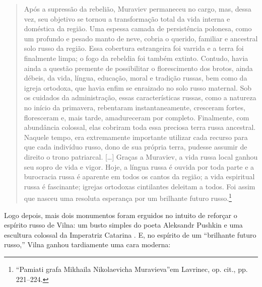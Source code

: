 \begin{quote}
Após a supressão da rebelião, Muraviev permaneceu no cargo, mas, dessa
vez, seu objetivo se tornou a transformação total da vida interna e
doméstica da região. Uma espessa camada de persistência polonesa, como
um profundo e pesado manto de neve, cobria o querido, familiar e
ancestral solo russo da região. Essa cobertura estrangeira foi varrida e
a terra foi finalmente limpa; o fogo da rebeldia foi também extinto.
Contudo, havia ainda a questão premente de possibilitar o florescimento
dos brotos, ainda débeis, da vida, língua, educação, moral e tradição
russas, bem como da igreja ortodoxa, que havia enfim se enraizado no
solo russo maternal. Sob os cuidados da administração, essas
características russas, como a natureza no início da primavera,
rebentaram instantaneamente, cresceram fortes, floresceram e, mais
tarde, amadureceram por completo. Finalmente, com abundância colossal,
elas cobriram toda essa preciosa terra russa ancestral. Naquele tempo,
era extremamente importante utilizar cada recurso para que cada
indivíduo russo, dono de sua própria terra, pudesse assumir de direito o
trono patriarcal. [\ldots{}] Graças a Muraviev, a vida russa local ganhou
seu sopro de vida e vigor. Hoje, a língua russa é ouvida por toda parte
e a burocracia russa é aparente em todos os cantos da região; a vida
espiritual russa é fascinante; igrejas ortodoxas cintilantes deleitam a
todos. Foi assim que nasceu uma resoluta esperança por um brilhante
futuro russo.\footnote{``Pamiati grafa Mikhaila Nikolaevicha Muravieva''em Lavrinec, op. cit., pp. 221--224.} 
\end{quote}

Logo depois, mais dois monumentos foram erguidos no intuito de reforçar
o espírito russo de Vilna: um busto simples do poeta Aleksandr Pushkin e
uma escultura colossal da Imperatriz Catarina . E, no espírito de um
``brilhante futuro russo,'' Vilna ganhou tardiamente uma cara moderna:

